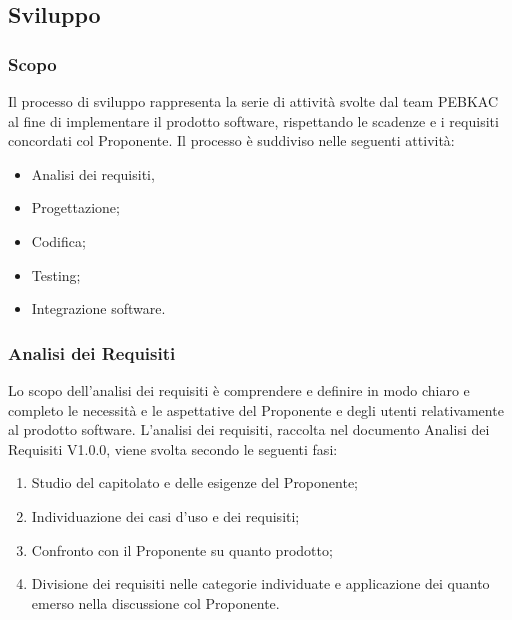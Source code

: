\subsection{Sviluppo}
\subsubsection{Scopo}
Il processo di sviluppo rappresenta la serie di attività svolte dal team PEBKAC al fine di implementare il prodotto software, rispettando le scadenze e i requisiti concordati col Proponente. 
Il processo è suddiviso nelle seguenti attività:
\begin{itemize}
    \item Analisi dei requisiti,
    \item Progettazione;
    \item Codifica;
    \item Testing;
    \item Integrazione software.
\end{itemize}

\subsubsection{Analisi dei Requisiti}
Lo scopo dell'analisi dei requisiti è comprendere e definire in modo chiaro e completo le necessità e le aspettative del Proponente e degli utenti relativamente al prodotto software.
L'analisi dei requisiti, raccolta nel documento Analisi dei Requisiti V1.0.0, viene svolta secondo le seguenti fasi:
\begin{enumerate}
    \item Studio del capitolato e delle esigenze del Proponente;
    \item Individuazione dei casi d'uso e dei requisiti;
    \item Confronto con il Proponente su quanto prodotto;
    \item Divisione dei requisiti nelle categorie individuate e applicazione dei quanto emerso nella discussione col Proponente.
\end{enumerate}

